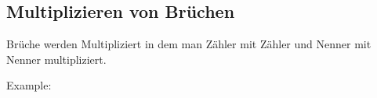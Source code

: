 \subsection{Multiplizieren von Brüchen}

Brüche werden Multipliziert in dem man Zähler mit Zähler und Nenner mit Nenner multipliziert.

\hfill \break
Example:
\fboxrule=0.8pt 